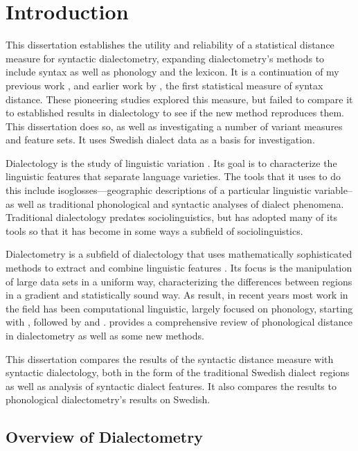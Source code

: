 \chapter{Introduction}

This dissertation establishes the utility and reliability of a
statistical distance measure for syntactic dialectometry, expanding
dialectometry's methods to include syntax as well as phonology and the
lexicon. It is a continuation of my previous work \cite{sanders07},
\cite{sanders08b} and earlier work by , the first
statistical measure of syntax distance. These pioneering studies
explored this measure, but failed to compare it to established results
in dialectology to see if the new method reproduces them. This
dissertation does so, as well as investigating a number of variant
measures and feature sets. It uses Swedish dialect data as a basis for
investigation.

Dialectology is the study of linguistic variation \cite{chambers98}.
Its goal is to characterize the linguistic features that separate
language varieties. The tools that it uses to do this include
isoglosses---geographic descriptions of a particular linguistic
variable--as well as traditional phonological and syntactic analyses
of dialect phenomena. Traditional dialectology predates
sociolinguistics, but has adopted many of its tools so that it has
become in some ways a subfield of sociolinguistics.

Dialectometry is a subfield of dialectology that uses mathematically
sophisticated methods to extract and combine linguistic features
\cite{seguy73}. Its focus is the manipulation of large data sets in a
uniform way, characterizing the differences between regions in a
gradient and statistically sound way. As result, in recent years most
work in the field has been computational linguistic, largely focused
on phonology, starting with , followed by
 and . 
provides a comprehensive review of phonological distance in
dialectometry as well as some new methods.

This dissertation compares the results of the syntactic distance
measure with syntactic dialectology, both in the form of the traditional
Swedish dialect regions as well as analysis of syntactic dialect
features. It also compares the results to phonological dialectometry's
results on Swedish.

\section{Overview of Dialectometry}


